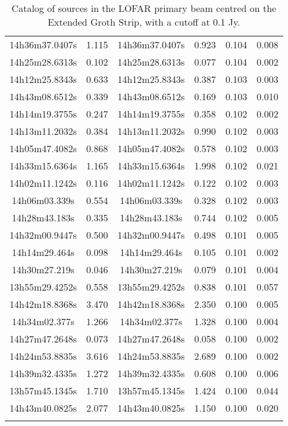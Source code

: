 \begin{longtable}[h!]{cccccc}
14h36m37.0407s & 1.115 & 14h36m37.0407s & 0.923 & 0.104 & 0.008 \\
14h25m28.6313s & 0.102 & 14h25m28.6313s & 0.077 & 0.104 & 0.002 \\
14h12m25.8343s & 0.633 & 14h12m25.8343s & 0.387 & 0.103 & 0.003 \\
14h43m08.6512s & 0.339 & 14h43m08.6512s & 0.169 & 0.103 & 0.010 \\
14h14m19.3755s & 0.247 & 14h14m19.3755s & 0.358 & 0.102 & 0.002 \\
14h13m11.2032s & 0.384 & 14h13m11.2032s & 0.990 & 0.102 & 0.003 \\
14h05m47.4082s & 0.868 & 14h05m47.4082s & 0.578 & 0.102 & 0.003 \\
14h33m15.6364s & 1.165 & 14h33m15.6364s & 1.998 & 0.102 & 0.021 \\
14h02m11.1242s & 0.116 & 14h02m11.1242s & 0.122 & 0.102 & 0.003 \\
14h06m03.339s & 0.554 & 14h06m03.339s & 0.328 & 0.102 & 0.003 \\
14h28m43.183s & 0.335 & 14h28m43.183s & 0.744 & 0.102 & 0.005 \\
14h32m00.9447s & 0.500 & 14h32m00.9447s & 0.498 & 0.101 & 0.005 \\
14h14m29.464s & 0.098 & 14h14m29.464s & 0.105 & 0.101 & 0.002 \\
14h30m27.219s & 0.046 & 14h30m27.219s & 0.079 & 0.101 & 0.004 \\
13h55m29.4252s & 0.558 & 13h55m29.4252s & 0.838 & 0.101 & 0.057 \\
14h42m18.8368s & 3.470 & 14h42m18.8368s & 2.350 & 0.100 & 0.005 \\
14h34m02.377s & 1.266 & 14h34m02.377s & 1.328 & 0.100 & 0.004 \\
14h27m47.2648s & 0.073 & 14h27m47.2648s & 0.058 & 0.100 & 0.002 \\
14h24m53.8835s & 3.616 & 14h24m53.8835s & 2.689 & 0.100 & 0.002 \\
14h39m32.4335s & 1.272 & 14h39m32.4335s & 0.608 & 0.100 & 0.006 \\
13h57m45.1345s & 1.710 & 13h57m45.1345s & 1.424 & 0.100 & 0.044 \\
14h43m40.0825s & 2.077 & 14h43m40.0825s & 1.150 & 0.100 & 0.020 \\
\caption{\label{widefield.survey.catalog} Catalog of sources in the LOFAR primary beam centred on the Extended Groth Strip, with a cutoff at 0.1 Jy.}
\end{longtable}
